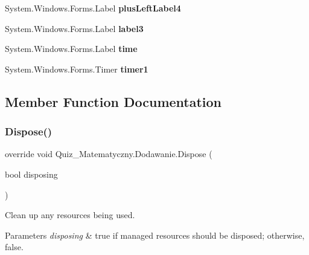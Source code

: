 \begin{DoxyCompactItemize}
\item 
\mbox{\label{class_quiz___matematyczny_1_1_dodawanie_aec8333d3b8eefcecc1f016688c3396e4}} 
System.\+Windows.\+Forms.\+Label {\bfseries plus\+Left\+Label4}
\item 
\mbox{\label{class_quiz___matematyczny_1_1_dodawanie_ae7ed283f2648b960a896ad394210e257}} 
System.\+Windows.\+Forms.\+Label {\bfseries label3}
\item 
\mbox{\label{class_quiz___matematyczny_1_1_dodawanie_a5457ac7728712993602afa1074addd23}} 
System.\+Windows.\+Forms.\+Label {\bfseries time}
\item 
\mbox{\label{class_quiz___matematyczny_1_1_dodawanie_aa56e040035f395c26490425ce4552caf}} 
System.\+Windows.\+Forms.\+Timer {\bfseries timer1}
\end{DoxyCompactItemize}


\subsection{Member Function Documentation}
\mbox{\label{class_quiz___matematyczny_1_1_dodawanie_a8f3cc785d2b35820abfebd5dc4101c18}} 
\subsubsection{\texorpdfstring{Dispose()}{Dispose()}}
{\footnotesize\ttfamily override void Quiz\+\_\+\+Matematyczny.\+Dodawanie.\+Dispose (\begin{DoxyParamCaption}\item[{bool}]{disposing }\end{DoxyParamCaption})\hspace{0.3cm}{\ttfamily [protected]}}



Clean up any resources being used. 


\begin{DoxyParams}{Parameters}
{\em disposing} & true if managed resources should be disposed; otherwise, false.\\
\hline
\end{DoxyParams}
\mbox{\label{class_quiz___matematyczny_1_1_dodawanie_ae39fb203b30ea0b007620f914f89e98c}} 
